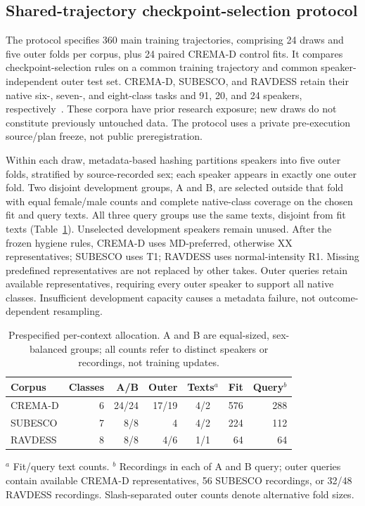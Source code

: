 \subsection{Shared-trajectory checkpoint-selection protocol}
\label{sec:final-program-methods}

The protocol specifies 360 main training trajectories, comprising 24 draws
and five outer folds per corpus, plus 24 paired CREMA-D control fits.
It compares checkpoint-selection rules on a common training trajectory and
common speaker-independent outer test set. CREMA-D, SUBESCO, and RAVDESS
retain their native six-, seven-, and eight-class tasks and 91, 20, and
24 speakers, respectively~\cite{cremad,subesco,ravdess}.
These corpora have prior research exposure;
new draws do not constitute previously untouched data. The protocol uses
a private pre-execution source/plan freeze, not public preregistration.

Within each draw, metadata-based hashing partitions speakers into five outer
folds, stratified by source-recorded sex; each speaker appears in exactly one
outer fold. Two disjoint development groups, A and B, are selected outside
that fold with equal female/male counts and complete native-class coverage
on the chosen fit and query texts. All three query groups use the same
texts, disjoint from fit texts (Table~\ref{tab:final-program-panels}).
Unselected development speakers remain unused. After the frozen hygiene
rules, CREMA-D uses MD-preferred, otherwise XX representatives; SUBESCO uses
T1; RAVDESS uses normal-intensity R1. Missing predefined representatives
are not replaced by other takes.
Outer queries retain available representatives, requiring every outer
speaker to support all native classes. Insufficient development capacity
causes a metadata failure, not outcome-dependent resampling.

\begin{table}[t]
\centering
\caption{Prespecified per-context allocation. A and B are equal-sized,
sex-balanced groups; all counts refer to distinct speakers or recordings,
not training updates.}
\label{tab:final-program-panels}
\small
\setlength{\tabcolsep}{3pt}
\begin{tabular}{lrrrcrr}
\hline
Corpus & Classes & A/B & Outer & Texts$^a$ & Fit & Query$^b$\\
\hline
CREMA-D & 6 & 24/24 & 17/19 & 4/2 & 576 & 288\\
SUBESCO & 7 & 8/8 & 4 & 4/2 & 224 & 112\\
RAVDESS & 8 & 8/8 & 4/6 & 1/1 & 64 & 64\\
\hline
\end{tabular}
\par\raggedright\small
$^a$ Fit/query text counts. $^b$ Recordings in each of A and B query;
outer queries contain available CREMA-D representatives, 56 SUBESCO
recordings, or 32/48 RAVDESS recordings. Slash-separated outer counts
denote alternative fold sizes.
\end{table}

